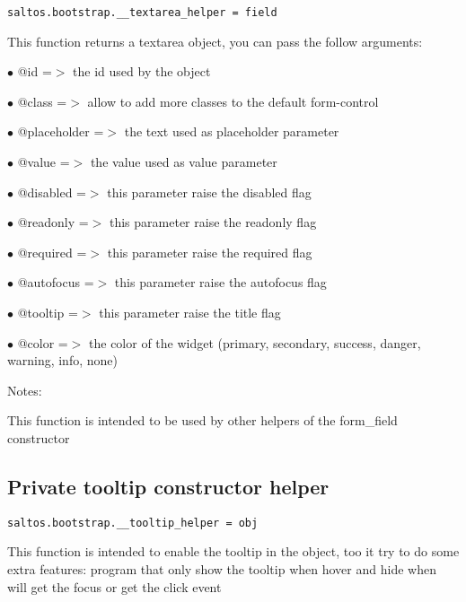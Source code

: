\documentclass[a4paper]{book}
\begin{document}
\begin{lstlisting}
saltos.bootstrap.__textarea_helper = field
\end{lstlisting}

This function returns a textarea object, you can pass the follow arguments:

\begin{compactitem}
\item[\color{myblue}$\bullet$] @id          =$>$ the id used by the object
\item[\color{myblue}$\bullet$] @class       =$>$ allow to add more classes to the default form-control
\item[\color{myblue}$\bullet$] @placeholder =$>$ the text used as placeholder parameter
\item[\color{myblue}$\bullet$] @value       =$>$ the value used as value parameter
\item[\color{myblue}$\bullet$] @disabled    =$>$ this parameter raise the disabled flag
\item[\color{myblue}$\bullet$] @readonly    =$>$ this parameter raise the readonly flag
\item[\color{myblue}$\bullet$] @required    =$>$ this parameter raise the required flag
\item[\color{myblue}$\bullet$] @autofocus   =$>$ this parameter raise the autofocus flag
\item[\color{myblue}$\bullet$] @tooltip     =$>$ this parameter raise the title flag
\item[\color{myblue}$\bullet$] @color       =$>$ the color of the widget (primary, secondary, success, danger, warning, info, none)
\end{compactitem}

Notes:

This function is intended to be used by other helpers of the form\_field constructor

\hypertarget{toc493}{}
\subsection{Private tooltip constructor helper}

\begin{lstlisting}
saltos.bootstrap.__tooltip_helper = obj
\end{lstlisting}

This function is intended to enable the tooltip in the object, too it try to do some
extra features: program that only show the tooltip when hover and hide when will get
the focus or get the click event
\end{document}
